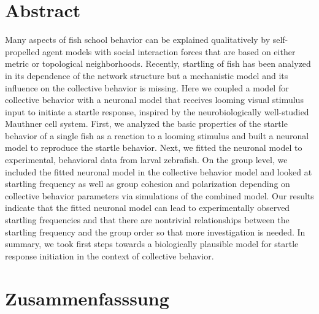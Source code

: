 \chapter*{Abstract}
		Many aspects of fish school behavior can be explained qualitatively by self-propelled agent models with social interaction forces that are based on either metric or topological neighborhoods.
		Recently, startling of fish has been analyzed in its dependence of the network structure 
		\citep{Rosenthal2015} but a mechanistic model and its influence on the collective behavior 
		is missing.
		Here we coupled a model for collective behavior with a neuronal model that receives looming visual stimulus input to initiate a startle response, inspired by the neurobiologically well-studied Mauthner cell system.
		First, we analyzed the basic properties of the startle behavior of a single fish as a reaction to a looming stimulus and built a neuronal model to reproduce the startle behavior.
        Next, we fitted the neuronal model to experimental, behavioral data from larval zebrafish.
		On the group level, we included the fitted neuronal model in the collective behavior model and looked at startling frequency as well as group cohesion and polarization depending on collective behavior parameters via simulations of the combined model.
		Our results indicate that the fitted neuronal model can lead to experimentally observed startling frequencies and that there are nontrivial relationships between the startling frequency and the group order so that more investigation is needed.
		In summary, we took first steps towards a biologically plausible model 
		for startle response initiation in the context of collective behavior.

\chapter*{Zusammenfasssung}

